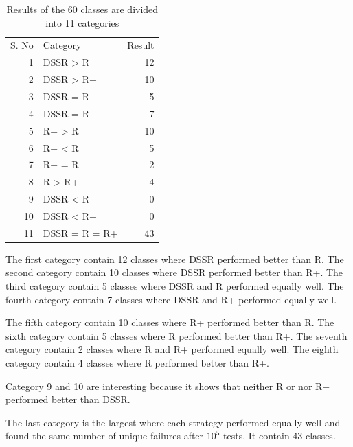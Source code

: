 \documentclass{acm_proc_article-sp}
\begin{document}
\begin{table}[h]
\caption{Results of the 60 classes are divided into 11 categories}
\centering
\begin{tabular}{rlr}
S. No	& 	Category			& 	Result\\
1		&	DSSR > R			&	12 \\	
2		&	DSSR > R+		&	10 \\	
3		&	DSSR = R			&	5 \\	
4		&	DSSR = R+		&	7 \\	
5		&	R+ > R 			&	10 \\	
6		&	R+ < R			&	5 \\	
7		&	R+ = R			&	2 \\	
8		&	R > R+			&	4 \\
9		&	DSSR < R			&	0 \\	
10		&	DSSR < R+		&	0 \\
11		&	DSSR = R = R+	&	43 \\			

\end{tabular}
\bigskip
\label{table:categories}
\end{table}









The first category contain 12 classes where DSSR performed better than R. 
The second category contain 10 classes where DSSR performed better than R+. 
The third category contain 5 classes where DSSR and R performed equally well.
The fourth category contain 7 classes where DSSR and R+ performed equally well. 

The fifth category contain 10 classes where R+ performed better than R.
The sixth category contain 5 classes where R performed better than R+.
The seventh category contain 2 classes where R and R+ performed equally well.
The eighth category contain 4 classes where R performed better than R+.

Category 9 and 10 are interesting because it shows that neither R or nor R+ performed better than DSSR.

The last category is the largest where each strategy performed equally well and found the same number of unique failures after $10^5$ tests. It contain 43 classes.
\end{document}
